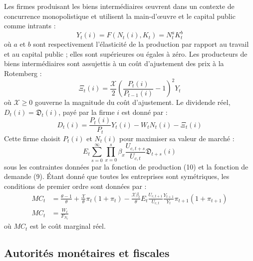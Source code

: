 \documentclass[12pt,letterpaper]{article}
\newcommand{\Et}{E_t}
\newcommand{\XX}{\mathcal{X}}
\newcommand{\DD}{\mathfrak{D}}
\begin{document}
Les firmes produisant les biens intermédiaires œuvrent dans un contexte de concurrence monopolistique et utilisent la main-d’œuvre et le capital public comme intrants :
\begin{equation}
Y_t(i) = F(N_t(i), K_t) = N_t^a K_t^b \tag{10}
\end{equation}
où $a$ et $b$ sont respectivement l’élasticité de la production par rapport au travail et au capital public ; elles sont supérieures ou égales à zéro. Les producteurs de biens intermédiaires sont assujettis à un coût d’ajustement des prix à la Rotemberg :
\begin{equation}
\Xi_t(i) = \frac{\XX}{2}\left(\frac{P_t(i)}{P_{t-1}(i)} - 1\right)^2 Y_t \tag{11}
\end{equation}
où $\XX \geq 0$ gouverne la magnitude du coût d’ajustement. Le dividende réel, $D_t(i) = \DD_t(i)$, payé par la firme $i$ est donné par :
\begin{equation}
D_t(i) = \frac{P_t(i)}{P_t} Y_t(i) - W_t N_t(i) - \Xi_t(i) \tag{12}
\end{equation}
Cette firme choisit $P_t(i)$ et $N_t(i)$ pour maximiser sa valeur de marché :
\begin{equation}
\Et \sum_{s=0}^{\infty} \prod_{x=0}^{s} \beta_x \frac{U_{c,t+s}}{U_{c,t}} \DD_{t+s}(i) \tag{13}
\end{equation}
sous les contraintes données par la fonction de production (10) et la fonction de demande (9). Étant donné que toutes les entreprises sont symétriques, les conditions de premier ordre sont données par :
\begin{align}
MC_t &= \frac{\theta-1}{\theta} + \frac{\XX}{\theta}\pi_t(1+\pi_t) - \frac{\XX\beta_t}{\theta}\Et\frac{U_{c,t+1}}{U_{c,t}}\frac{Y_{t+1}}{Y_t}\pi_{t+1}(1+\pi_{t+1}) \tag{14}\\
MC_t &= \frac{W_t}{F_{N_t}} \tag{15}
\end{align}
où $MC_t$ est le coût marginal réel.

\subsection{Autorités monétaires et fiscales}
\end{document}
